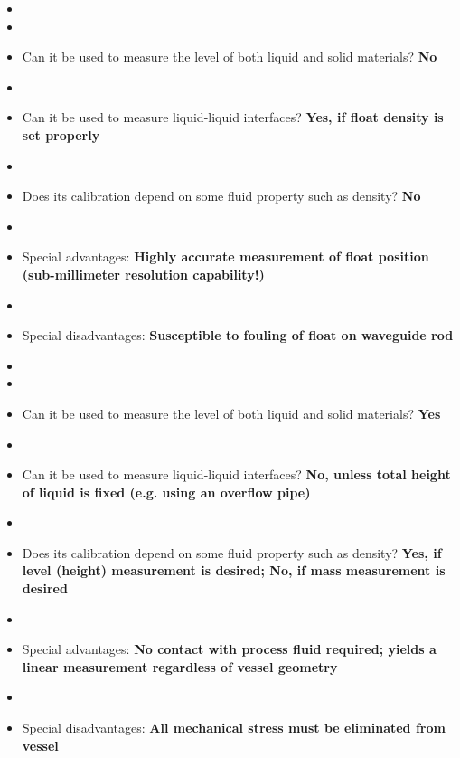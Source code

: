 \vskip 10pt

\begin{itemize}
\goodbreak
\item{} 
\item\item{} Can it be used to measure the level of both liquid and solid materials? {\bf No}
\item\item{} Can it be used to measure liquid-liquid interfaces? {\bf Yes, if float density is set properly}
\item\item{} Does its calibration depend on some fluid property such as density? {\bf No}
\item\item{} Special advantages: {\bf Highly accurate measurement of float position (sub-millimeter resolution capability!)}
\item\item{} Special disadvantages: {\bf Susceptible to fouling of float on waveguide rod}
\end{itemize}

\vskip 10pt

\begin{itemize}
\goodbreak
\item{} 
\item\item{} Can it be used to measure the level of both liquid and solid materials? {\bf Yes}
\item\item{} Can it be used to measure liquid-liquid interfaces? {\bf No, unless total height of liquid is fixed (e.g. using an overflow pipe)}
\item\item{} Does its calibration depend on some fluid property such as density? {\bf Yes, if level (height) measurement is desired; No, if mass measurement is desired}
\item\item{} Special advantages: {\bf No contact with process fluid required; yields a linear measurement regardless of vessel geometry}
\item\item{} Special disadvantages: {\bf All mechanical stress must be eliminated from vessel}
\end{itemize}

\vskip 10pt


